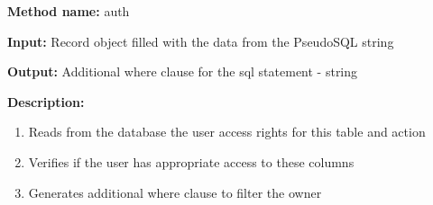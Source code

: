 \textbf{Method name:} auth 

\textbf{Input:} Record object filled with the data from the PseudoSQL
string 

\textbf{Output:} Additional where clause for the sql statement - string 

\textbf{Description:} 

\begin{enumerate}
\item Reads from the database the user access rights for this table and
action 
\item Verifies if the user has appropriate access to these columns 
\item Generates additional where clause to filter the owner
\end{enumerate}

